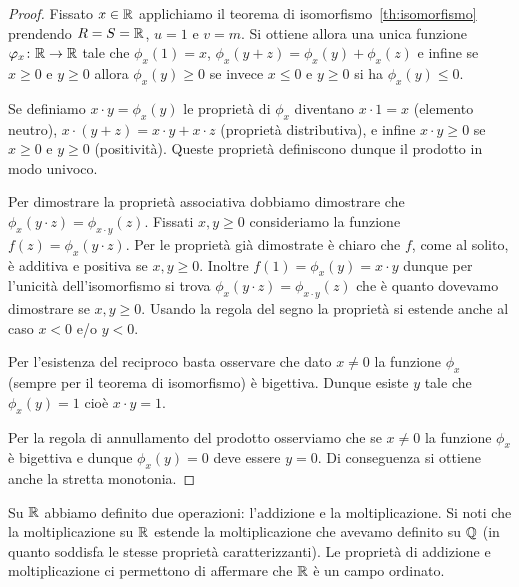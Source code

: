 \begin{proof}
Fissato $x\in {\mathbb R}$
applichiamo il teorema di isomorfismo~\ref{th:isomorfismo}
prendendo $R=S={\mathbb R}$, $u=1$ e $v=m$.
Si ottiene allora una unica funzione $\varphi_x\colon {\mathbb R}\to {\mathbb R}$ 
tale che $\phi_x(1)=x$, $\phi_x(y+z)=\phi_x(y)+\phi_x(z)$ 
e infine se $x\ge 0$ e $y\ge 0$ 
allora $\phi_x(y)\ge 0$ se 
invece $x\le 0$ e $y\ge 0$ si ha $\phi_x(y)\le 0$.

Se definiamo $x\cdot y = \phi_x(y)$ 
le proprietà di $\phi_x$ diventano 
$x\cdot 1 = x$ (elemento neutro), 
$x\cdot (y+z) = x\cdot y + x\cdot z$ (proprietà distributiva),
e infine $x\cdot y\ge 0$ se $x\ge 0$ e $y\ge 0$ (positività).
Queste proprietà definiscono dunque il prodotto 
in modo univoco. 

Per dimostrare la proprietà associativa dobbiamo dimostrare che 
$\phi_x(y\cdot z) = \phi_{x\cdot y}(z)$.
Fissati $x,y\ge 0$ consideriamo 
la funzione $f(z) = \phi_x(y\cdot z)$.
Per le proprietà già dimostrate è chiaro 
che $f$, come al solito, è additiva e positiva
se $x,y\ge 0$.
Inoltre $f(1) = \phi_x(y) = x\cdot y$ 
dunque per l'unicità dell'isomorfismo si 
trova $\phi_x(y\cdot z) = \phi_{x\cdot y}(z)$
che è quanto dovevamo dimostrare se $x,y\ge 0$.
Usando la regola del segno la proprietà si estende 
anche al caso $x<0$ e/o $y<0$.

Per l'esistenza del reciproco basta osservare 
che dato $x\neq 0$ la funzione $\phi_x$ 
(sempre per il teorema di isomorfismo) è 
bigettiva. Dunque esiste $y$ tale che $\phi_x(y)=1$
cioè $x\cdot y = 1$.

Per la regola di annullamento del prodotto osserviamo che 
se $x\neq 0$ la funzione $\phi_x$ è bigettiva 
e dunque $\phi_x(y)=0$ deve essere $y=0$.
Di conseguenza si ottiene anche la stretta monotonia.
\end{proof}

Su ${\mathbb R}$ abbiamo definito due operazioni: l'addizione e la moltiplicazione.
Si noti che la moltiplicazione su ${\mathbb R}$ estende la moltiplicazione che 
avevamo definito su ${\mathbb Q}$ (in quanto soddisfa le stesse proprietà 
caratterizzanti).
Le proprietà di addizione e moltiplicazione ci permettono di
affermare che ${\mathbb R}$ è un campo ordinato.

